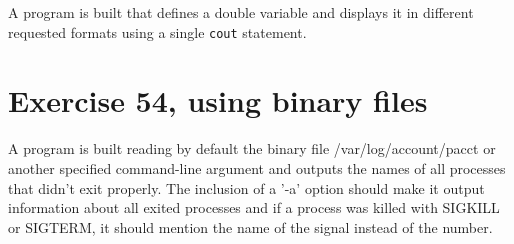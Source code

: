 \documentclass[11pt]{article}
\begin{document}
A program is built that defines a double variable and displays it in different requested formats using a single \texttt{cout} statement.



\section*{Exercise 54, using binary files}

A program is built reading by default the binary file /var/log/account/pacct or another specified command-line argument and outputs the names of all processes that didn't exit properly. The inclusion of a '-a' option should make it output information about all exited processes and if a process was killed with SIGKILL or SIGTERM, it should mention the name of the signal instead of the number.







\end{document}
